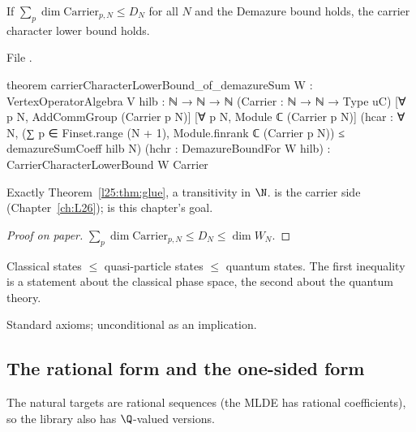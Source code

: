 \begin{theorem}\label{l25:thm:glue}
If $\sum_p\dim\mathrm{Carrier}_{p,N}\le D_N$ for all $N$ and the Demazure bound holds, the carrier character lower
bound holds.
\end{theorem}
\noindent File .
\begin{leancode}
theorem carrierCharacterLowerBound_of_demazureSum {W : VertexOperatorAlgebra V}
    {hilb : ℕ → ℕ → ℕ}
    (Carrier : ℕ → ℕ → Type uC)
    [∀ p N, AddCommGroup (Carrier p N)] [∀ p N, Module ℂ (Carrier p N)]
    (hcar : ∀ N, (∑ p ∈ Finset.range (N + 1), Module.finrank ℂ (Carrier p N)) ≤
      demazureSumCoeff hilb N)
    (hchr : DemazureBoundFor W hilb) :
    CarrierCharacterLowerBound W Carrier
\end{leancode}
\begin{dictionary}
Exactly Theorem~\ref{l25:thm:glue}, a transitivity in $\N$.  is the carrier side
(Chapter~\ref{ch:L26});  is this chapter's goal.
\end{dictionary}
\begin{proof}[Proof on paper]
$\sum_p\dim\mathrm{Carrier}_{p,N}\le D_N\le\dim W_N$.
\end{proof}
\begin{physics}
Classical states $\le$ quasi-particle states $\le$ quantum states. The first inequality is a statement about
the classical phase space, the second about the quantum theory.
\end{physics}
\begin{status}
Standard axioms; unconditional as an implication.
\end{status}

\subsection{The rational form and the one-sided form}

The natural targets are rational sequences (the MLDE has rational coefficients), so the library also has
$\Q$-valued versions.

